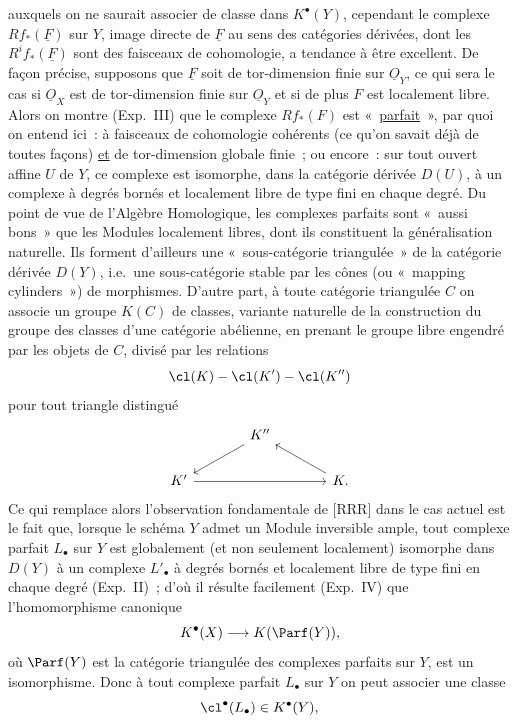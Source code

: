auxquels on ne saurait associer de classe dans $K^\bullet(Y)$, cependant le complexe $Rf_*(\underline F)$ sur $Y$, image directe de $\underline F$ au sens des catégories dérivées, dont les $R^if_*(\underline F)$ sont des faisceaux de cohomologie, a tendance à être excellent. De façon précise, supposons que $\underline F$ soit de tor-dimension finie sur $\underline O_Y$, ce qui sera le cas si $\underline O_X$ est de tor-dimension finie sur $\underline O_Y$ et si de plus $F$ est localement libre. Alors on montre (Exp.\ III) que le complexe $Rf_*(F)$ est «~\underline{parfait}~», par quoi on entend ici~: à faisceaux de cohomologie cohérents (ce qu'on savait déjà de toutes façons) \underline{et} de tor-dimension globale finie~; ou encore~: sur tout ouvert affine $U$ de $Y$, ce complexe est isomorphe, dans la catégorie dérivée $D(U)$, à un complexe à degrés bornés et localement libre de type fini en chaque degré. Du point de vue de l'Algèbre Homologique, les complexes parfaits sont «~aussi bons~» que les Modules localement libres, dont ils constituent la généralisation naturelle. Ils forment d'ailleurs une «~sous-catégorie triangulée~» de la catégorie dérivée $D(Y)$, i.e.\ une sous-catégorie stable par les cônes (ou «~mapping cylinders~») de morphismes. D'autre part, à toute catégorie triangulée $C$ on associe un groupe $K(C)$ de classes, variante naturelle de la construction du groupe des classes d'une catégorie abélienne, en prenant le groupe libre engendré par les objets de $C$, divisé par les relations
\[
\cl(K)-\cl(K')-\cl(K'')
\]
pour tout triangle distingué
\[
\begin{tikzcd}[column sep=large]
 & K'' \arrow[dl] & \\
K' \arrow[rr] & & K \arrow[ul] .
\end{tikzcd}
\]
Ce qui remplace alors l'observation fondamentale de [RRR] dans le cas actuel est le fait que, lorsque le schéma $Y$ admet un Module inversible ample, tout complexe parfait $L_\bullet$ sur $Y$ est globalement (et non seulement localement) isomorphe dans $D(Y)$ à un complexe $L'_\bullet$ à degrés bornés et localement libre de type fini en chaque degré (Exp.\ II)~; d'où il résulte facilement (Exp.\ IV) que l'homomorphisme canonique
\[
K^\bullet(X)\longrightarrow K(\Parf(Y)),
\]
où $\Parf(Y)$ est la catégorie triangulée des complexes parfaits sur $Y$, est un isomorphisme. Donc à tout complexe parfait $L_\bullet$ sur $Y$ on peut associer une classe
\[
\cl^\bullet(L_\bullet)\in K^\bullet(Y),
\]
